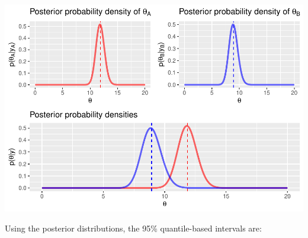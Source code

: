 \documentclass[
  11pt,
]{article}
\begin{document}
\includegraphics{1_hw_bs_code_files/figure-latex/x2a1-1.pdf}

\normalsize

Using the posterior distributions, the 95\% quantile-based intervals
are:

\scriptsize
\end{document}
